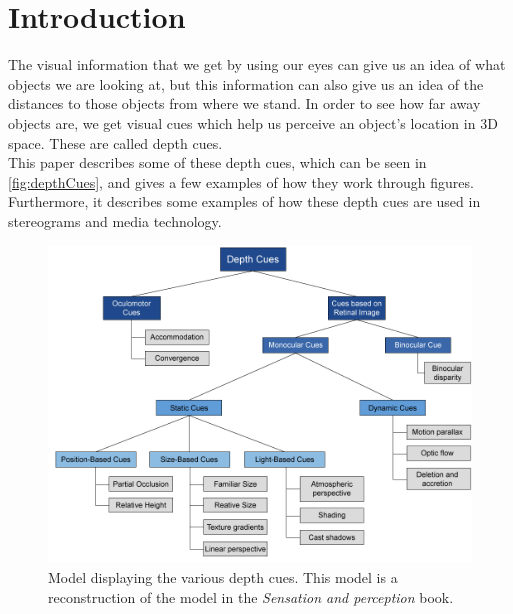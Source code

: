 \section{Introduction}

The visual information that we get by using our eyes can give us an idea of what objects we are looking at, but this information can also give us an idea of the distances to those objects from where we stand. In order to see how far away objects are, we get visual cues which help us perceive an object's location in 3D space. These are called depth cues\citep[p.~195]{sensationPerception}.\\
This paper describes some of these depth cues, which can be seen in \autoref{fig:depthCues}, and gives a few examples of how they work through figures. Furthermore, it describes some examples of how these depth cues are used in stereograms and media technology.

\begin{figure}[H]
	\centering
	\includegraphics[width=1\linewidth]{figure/Analysis/depthCues.png}
	\caption{Model displaying the various depth cues. This model is a reconstruction of the model in the \textit{Sensation and perception} book\citep[p.~195]{sensationPerception}.}
	\label{fig:depthCues}
\end{figure}